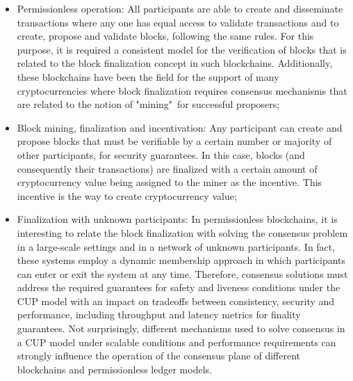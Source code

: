 \begin{itemize}
    \item Permissionless operation: All participants are able to create and disseminate transactions where any one has equal access to validate transactions and to create, propose and validate blocks, following the same rules. For this purpose, it is required a consistent model for the verification of blocks that is related to the block finalization concept in such blockchains. Additionally, these blockchains have been the field for the support of many cryptocurrencies where block finalization requires consensus mechanisms that are related to the notion of "mining"~for successful proposers;
    \item Block mining, finalization and incentivation: Any participant can create and propose blocks that must be verifiable by a certain number or majority of other participants, for security guarantees. In this case, blocks (and consequently their transactions) are finalized with a certain amount of cryptocurrency value being assigned to the miner as the incentive. This incentive is the way to create cryptocurrency value;
    \item Finalization with unknown participants: In permissionless blockchains, it is interesting to relate the block finalization with solving the consensus problem in a large-scale settings and in a network of unknown participants. In fact, these systems employ a dynamic membership approach in which participants can enter or exit the system at any time. Therefore, consensus solutions must address the required guarantees for safety and liveness conditions under the \gls{CUP} model with an impact on tradeoffs between consistency, security and performance, including throughput and latency metrics for finality guarantees. Not surprisingly, different mechanisms used to solve consensus in a \gls{CUP} model under scalable conditions and performance requirements can strongly influence the operation of the consensus plane of different blockchains and permissionless ledger models.
\end{itemize}

